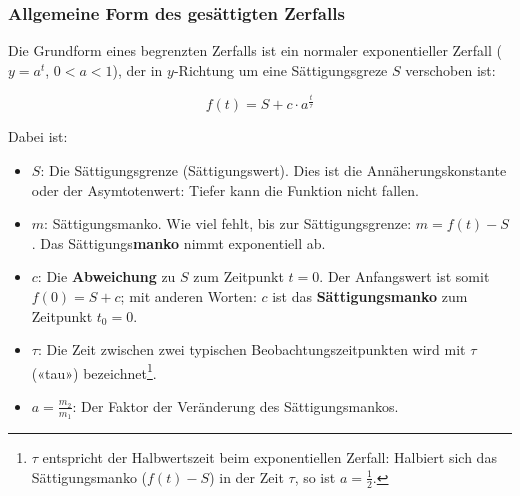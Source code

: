 \subsubsection{Allgemeine Form des gesättigten Zerfalls}
\begin{center}
\end{center}

Die Grundform eines begrenzten Zerfalls ist ein normaler
exponentieller Zerfall ($y=a^{t}$, $0<a<1$), der in $y$-Richtung um eine Sättigungsgreze $S$ verschoben ist:


$$f(t) = S + c\cdot{}a^{\frac{t}{\tau}}$$

Dabei ist:
\begin{itemize}
	\item $S$: Die Sättigungsgrenze (Sättigungswert). Dies ist die Annäherungskonstante oder der Asymtotenwert: Tiefer kann die Funktion nicht fallen.

	\item $m$:  Sättigungsmanko. Wie viel fehlt, bis zur
    Sättigungsgrenze: $m = f(t) - S$. Das Sättigungs\textbf{manko} nimmt exponentiell ab.
	\item $c$: Die \textbf{Abweichung} zu $S$ zum Zeitpunkt $t=0$. Der
    Anfangswert ist somit $f(0) = S + c$; mit anderen Worten: $c$ ist das
    \textbf{Sättigungsmanko} zum Zeitpunkt $t_0 = 0$.
	\item $\tau$: Die Zeit zwischen zwei typischen Beobachtungszeitpunkten wird
    mit $\tau$ («tau») bezeichnet\footnote{$\tau$ entspricht der
      Halbwertszeit beim exponentiellen Zerfall: Halbiert sich das
      Sättigungsmanko ($f(t)-S$) in der Zeit $\tau$, so ist $a=\frac12$.}.
    \item $a=\frac{m_2}{m_1}$: Der Faktor der Veränderung des
      Sättigungsmankos.
\end{itemize}


